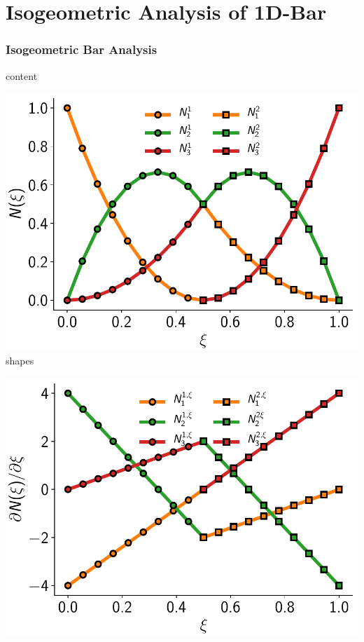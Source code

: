 \documentclass{beamer}
\begin{document}
\section{Isogeometric Analysis of 1D-Bar}
\begin{frame}[allowframebreaks] \frametitle{Isogeometric Bar Analysis}

  content

  \newpage

  \begin{minipage}[b]{0.48\linewidth}
    \includegraphics[width=1.0\textwidth]{figures/bar-basis-functions.pdf} \\
    \centering \footnotesize{shapes}
  \end{minipage}
  \begin{minipage}[b]{0.48\linewidth}
    \includegraphics[width=1.0\textwidth]{figures/bar-basis-function-derivatives.pdf} \\

\end{minipage}
\end{frame}
\end{document}
